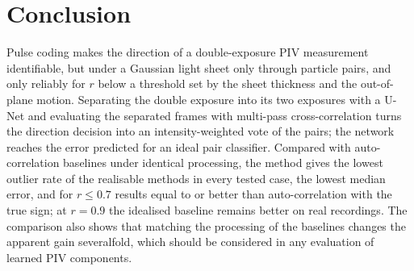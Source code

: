 \documentclass[11pt]{article}
\theoremstyle{remark}
\begin{document}
\section{Conclusion}
Pulse coding makes the direction of a double-exposure PIV measurement identifiable, but under a Gaussian light sheet only through particle pairs, and only reliably for $r$ below a threshold set by the sheet thickness and the out-of-plane motion.
Separating the double exposure into its two exposures with a U-Net and evaluating the separated frames with multi-pass cross-correlation turns the direction decision into an intensity-weighted vote of the pairs; the network reaches the error predicted for an ideal pair classifier.
Compared with auto-correlation baselines under identical processing, the method gives the lowest outlier rate of the realisable methods in every tested case, the lowest median error, and for $r\le0.7$ results equal to or better than auto-correlation with the true sign; at $r=0.9$ the idealised baseline remains better on real recordings.
The comparison also shows that matching the processing of the baselines changes the apparent gain severalfold, which should be considered in any evaluation of learned PIV components.



\end{document}
